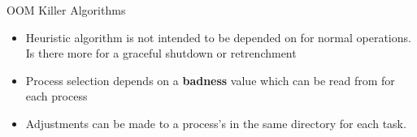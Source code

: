\begin{frame}
   {OOM Killer Algorithms}

   \begin{itemize}

      \item
      Heuristic algorithm is not intended to be depended on for
      normal operations.  Is there more for a graceful shutdown or
      retrenchment
      \item
      Process selection depends on a \textbf{badness} value which can
      be read from  for each process
      \item
      Adjustments can be made to a process's  in the
      same directory for each task.
   \end{itemize}

\end{frame}


